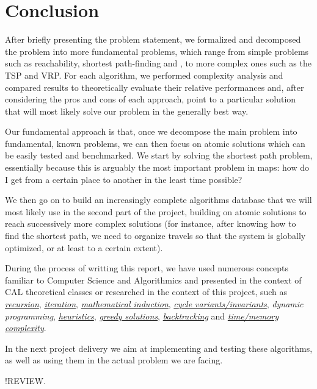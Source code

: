 \chapter{Conclusion} \label{conclusion}
After briefly presenting the problem statement, we formalized and decomposed the problem into more fundamental problems, which range from simple problems such as reachability, shortest path-finding and , to more complex ones such as the \acrshort{TSP} and \acrshort{VRP}. For each algorithm, we performed complexity analysis and compared results to theoretically evaluate their relative performances and, after considering the pros and cons of each approach, point to a particular solution that will most likely solve our problem in the generally best way.\par
Our fundamental approach is that, once we decompose the main problem into fundamental, known problems, we can then focus on atomic solutions which can be easily tested and benchmarked. We start by solving the shortest path problem, essentially because this is arguably the most important problem in maps: how do I get from a certain place to another in the least time possible?\par
We then go on to build an increasingly complete algorithms database that we will most likely use in the second part of the project, building on atomic solutions to reach successively more complex solutions (for instance, after knowing how to find the shortest path, we need to organize travels so that the system is globally optimized, or at least to a certain extent).\par
During the process of writting this report, we have used numerous concepts familiar to Computer Science and Algorithmics and presented in the context of CAL theoretical classes or researched in the context of this project, such as \emph{\hyperref[glsentry-recursive]{recursion}}, \emph{\hyperref[glsentry-iterative]{iteration}}, \emph{\hyperref[teor:dfs]{mathematical induction}}, \emph{\hyperref[sec:dijkstra-PoC]{cycle variants/invariants}}, \emph{\gls{dynamic programming}}, \emph{\hyperref[glsentry-heuristic]{heuristics}}, \emph{\hyperref[glsentry-greedy]{greedy solutions}}, \emph{\hyperref[algorithm-reachability-dfs]{backtracking}} and \emph{\hyperref[complexity-analysis]{time/memory complexity}}.\par

In the next project delivery we aim at implementing and testing these algorithms, as well as using them in the actual problem we are facing.\par
!REVIEW.
